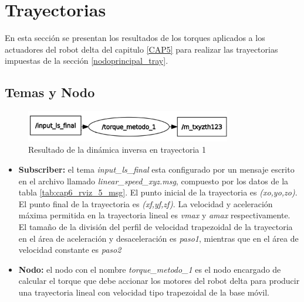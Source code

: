         
        
        
        
\newpage


\section{Trayectorias}
    En esta sección se presentan los resultados de los torques aplicados a los actuadores del robot delta del capitulo \ref{CAP5} para realizar las trayectorias impuestas de la sección \ref{nodoprincipal_tray}.

    \subsection{Temas y Nodo}
    
    \begin{figure}[h]
            \centering
            \includegraphics[width=0.8\textwidth]{Main/Chapter7/Images7/nodo_3.jpg}
            \caption{Resultado de la dinámica inversa en trayectoria 1}
            \label{f:cap7_tray_5_nodo}
    \end{figure}
    
    \begin{itemize}
        \item {\textbf{Subscriber:}  el tema \textit{input\_ls\_final} esta configurado por un mensaje escrito en el archivo llamado \textit{linear\_speed\_xyz.msg}, compuesto por los datos de la tabla \ref{tab:cap6_rviz_5_msg}. El punto inicial de la trayectoria es \textit{(xo,yo,zo)}. El punto final de la trayectoria es \textit{(xf,yf,zf)}. La velocidad y aceleración máxima permitida en la trayectoria lineal es \textit{vmax} y \textit{amax} respectivamente. El tamaño de la división del perfil de velocidad trapezoidal de la trayectoria en el área de aceleración y desaceleración es \textit{paso1}, mientras que en el área de velocidad constante es \textit{paso2}}
        \item {\textbf{Nodo:} el nodo con el nombre \textit{torque\_metodo\_1} es el nodo encargado de calcular el torque que debe accionar los motores del robot delta para producir una trayectoria lineal con velocidad tipo trapezoidal de la base móvil.}
    \end{itemize}
    

